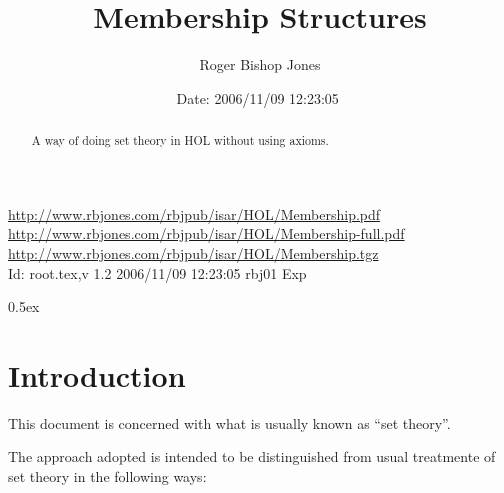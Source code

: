 \documentclass[11pt,a4paper]{article}
\begin{document}
\title{Membership Structures}
\author{Roger Bishop Jones}
\date{$ $Date: 2006/11/09 12:23:05 $ $}
\maketitle

\begin{abstract}
A way of doing set theory in HOL without using axioms.
\end{abstract}

\vfill
\begin{centering}
{\footnotesize
\href{http://www.rbjones.com/rbjpub/isar/HOL/Membership.pdf}{http://www.rbjones.com/rbjpub/isar/HOL/Membership.pdf}\\
\href{http://www.rbjones.com/rbjpub/isar/HOL/Membership-full.pdf}{http://www.rbjones.com/rbjpub/isar/HOL/Membership-full.pdf}\\
\href{http://www.rbjones.com/rbjpub/isar/HOL/Membership.tgz}{http://www.rbjones.com/rbjpub/isar/HOL/Membership.tgz}\\
$ $Id: root.tex,v 1.2 2006/11/09 12:23:05 rbj01 Exp $ $
}%
\end{centering}

\newpage

\tableofcontents

\parindent 0pt\parskip 0.5ex

\section{Introduction}

This document is concerned with what is usually known as ``set theory''.

The approach adopted is intended to be distinguished from usual treatmente of set theory in the following ways:
\end{document}
